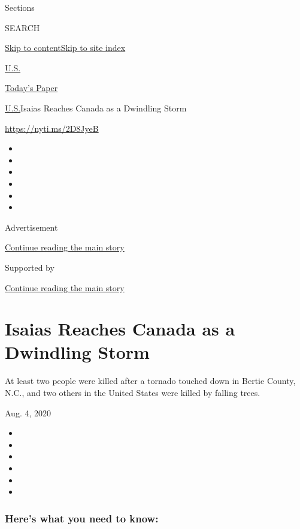 Sections

SEARCH

\protect\hyperlink{site-content}{Skip to
content}\protect\hyperlink{site-index}{Skip to site index}

\href{https://www.nytimes.com/section/us}{U.S.}

\href{https://myaccount.nytimes.com/auth/login?response_type=cookie\&client_id=vi}{}

\href{https://www.nytimes.com/section/todayspaper}{Today's Paper}

\href{/section/us}{U.S.}\textbar{}Isaias Reaches Canada as a Dwindling
Storm

\url{https://nyti.ms/2D8JyeB}

\begin{itemize}
\item
\item
\item
\item
\item
\item
\end{itemize}

Advertisement

\protect\hyperlink{after-top}{Continue reading the main story}

Supported by

\protect\hyperlink{after-sponsor}{Continue reading the main story}

\hypertarget{isaias-reaches-canada-as-a-dwindling-storm}{%
\section{Isaias Reaches Canada as a Dwindling
Storm}\label{isaias-reaches-canada-as-a-dwindling-storm}}

At least two people were killed after a tornado touched down in Bertie
County, N.C., and two others in the United States were killed by falling
trees.

Aug. 4, 2020

\begin{itemize}
\item
\item
\item
\item
\item
\item
\end{itemize}

\hypertarget{heres-what-you-need-to-know}{%
\subsubsection{Here's what you need to
know:}\label{heres-what-you-need-to-know}}

